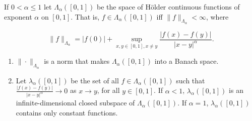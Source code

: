 \documentclass[12pt,a4paper]{article}
\begin{document}
\begin{problem}\label{prob:5-11}
If $0 < \alpha \le 1$ let $\Lambda_\alpha([0,1])$ be the space of H\"older continuous functions of exponent $\alpha$ on $[0,1]$. That is, $f \in \Lambda_\alpha([0,1])$ iff $\|f\|_{\Lambda_\alpha} < \infty$, where


$$\|f\|_{\Lambda_\alpha} = |f(0)| + \sup_{x,y \in [0,1], x \ne y} \frac{|f(x)-f(y)|}{|x-y|^\alpha}.$$


\begin{enumerate}[label=\alph*.]
\item $\|\cdot\|_{\Lambda_\alpha}$ is a norm that makes $\Lambda_\alpha([0,1])$ into a Banach space.
\item Let $\lambda_\alpha([0,1])$ be the set of all $f \in \Lambda_\alpha([0,1])$ such that $\frac{|f(x)-f(y)|}{|x-y|^\alpha} \rightarrow 0$ as $x \rightarrow y$, for all $y \in [0,1]$. If $\alpha < 1$, $\lambda_\alpha([0,1])$ is an infinite-dimensional closed subspace of $\Lambda_\alpha([0,1])$. If $\alpha=1$, $\lambda_\alpha([0,1])$ contains only constant functions.
\end{enumerate}
\end{problem}
\end{document}
